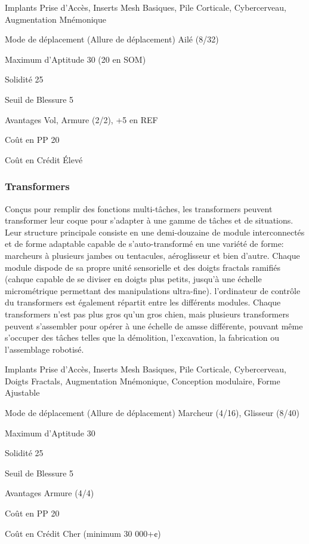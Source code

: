 \begin{description*} \item[Implants] Prise d'Accès, Inserts Mesh Basiques, Pile Corticale, Cybercerveau, Augmentation Mnémonique \item[Mode de déplacement](Allure de déplacement) Ailé (8/32) \item[Maximum d'Aptitude] 30 (20 en SOM) \item[Solidité] 25 \item[Seuil de Blessure] 5 \item[Avantages] Vol, Armure (2/2), +5 en REF \item[Coût en PP] 20 \item[Coût en Crédit] Élevé \end{description*} 

\subsubsection{Transformers} \label{sec:starting-flexbots} 

Conçus pour remplir des fonctions multi-tâches, les transformers peuvent transformer leur coque pour s'adapter à une gamme de tâches et de situations. Leur structure principale consiste en une demi-douzaine de module interconnectés et de forme adaptable capable de s'auto-transformé en une variété de forme: marcheurs à plusieurs jambes ou tentacules, aéroglisseur et bien d'autre. Chaque module dispode de sa propre unité sensorielle et des doigts fractals ramifiés (cahque capable de se diviser en doigts plus petits, jusqu'à une échelle micrométrique permettant des manipulations ultra-fine). l'ordinateur de contrôle du transformers est également répartit entre les différents modules. Chaque transformers n'est pas plus gros qu'un gros chien, mais plusieurs transformers peuvent s'assembler pour opérer à une échelle de amsse différente, pouvant même s'occuper des tâches telles que la démolition, l'excavation, la fabrication ou l'assemblage robotisé. 

\begin{description*} \item[Implants] Prise d'Accès, Inserts Mesh Basiques, Pile Corticale, Cybercerveau, Doigts Fractals, Augmentation Mnémonique, Conception modulaire, Forme Ajustable \item[Mode de déplacement](Allure de déplacement) Marcheur (4/16), Glisseur (8/40) \item[Maximum d'Aptitude] 30 \item[Solidité] 25 \item[Seuil de Blessure] 5 \item[Avantages] Armure (4/4) \item[Coût en PP] 20 \item[Coût en Crédit] Cher (minimum 30 000+¢) \end{description*} 

